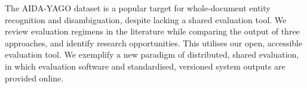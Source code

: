 The AIDA-YAGO dataset is a popular target for whole-document entity recognition and disambiguation, despite lacking a shared evaluation tool. We review evaluation regimens in the literature while comparing the output of three approaches, and identify research opportunities. This utilises our open, accessible evaluation tool. We exemplify a new paradigm of distributed, shared evaluation, in which evaluation software and standardised, versioned system outputs are provided online.
